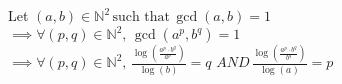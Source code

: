 \documentclass{article}
\begin{document}
\noindent Let $ (a,b) \in \mathbb{N}^2 \, \text{such that} \, \gcd(a, b) = 1$\\
$\implies \forall (p,q) \in \mathbb{N}^2, \, \gcd(a^p, b^q) = 1 $\\
$\implies \forall (p,q) \in \mathbb{N}^2, \,  \frac{\log\left(\frac{a^p \cdot b^q}{a^p}\right)}{\log(b)} = q $
$AND \, \frac{\log\left(\frac{a^p \cdot b^q}{b^q}\right)}{\log(a)} = p$
\end{document}
